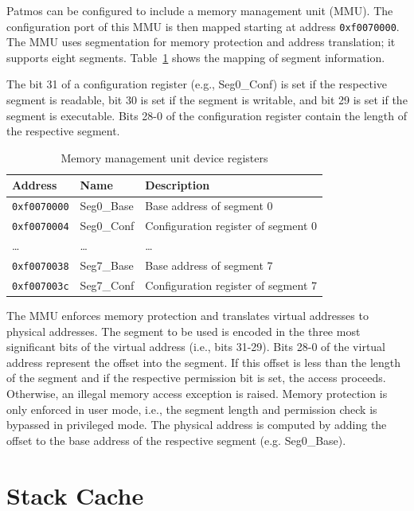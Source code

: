 \documentclass[a4paper,fontsize=10pt,twoside,DIV15,BCOR12mm,headinclude=true,footinclude=false,pagesize,bibtotoc]{scrbook}
\newcommand{\code}[1]{{\texttt{#1}}}
\begin{document}
Patmos can be configured to include a memory management unit
(MMU). The configuration port of this MMU is then mapped starting at
address \code{0xf0070000}. The MMU uses segmentation for memory
protection and address translation; it supports eight
segments. Table~\ref{tab:mmu} shows the mapping of segment
information.

The bit 31 of a configuration register (e.g., Seg0\_Conf) is
set if the respective segment is readable, bit 30 is set if the
segment is writable, and bit 29 is set if the segment is
executable. Bits 28-0 of the configuration register contain the length
of the respective segment.

\begin{table}
\centering
\begin{tabular}{lll}
\toprule
Address & Name & Description \\
\midrule
\code{0xf0070000} & Seg0\_Base & Base address of segment 0 \\
\code{0xf0070004} & Seg0\_Conf & Configuration register of segment 0 \\
\dots & \dots & \dots \\
\code{0xf0070038} & Seg7\_Base & Base address of segment 7 \\
\code{0xf007003c} & Seg7\_Conf & Configuration register of segment 7 \\
\bottomrule
\end{tabular}
\caption{Memory management unit device registers}
\label{tab:mmu}
\end{table}

The MMU enforces memory protection and translates virtual addresses to
physical addresses. The segment to be used is encoded in the three
most significant bits of the virtual address (i.e., bits 31-29). Bits
28-0 of the virtual address represent the offset into the segment. If
this offset is less than the length of the segment and if the
respective permission bit is set, the access proceeds. Otherwise, an
illegal memory access exception is raised. Memory protection is only
enforced in user mode, i.e., the segment length and permission check
is bypassed in privileged mode. The physical address is computed by
adding the offset to the base address of the respective segment
(e.g. Seg0\_Base).

\section{Stack Cache}
\label{sec:stack-cache}
\end{document}
